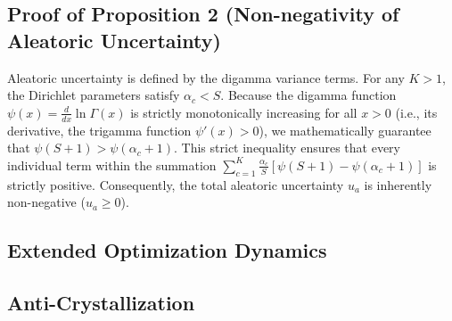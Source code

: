 \documentclass[letterpaper]{article} %
\begin{document}
\subsection{Proof of Proposition 2 (Non-negativity of Aleatoric Uncertainty)}
Aleatoric uncertainty is defined by the digamma variance terms. For any $K > 1$, the Dirichlet parameters satisfy $\alpha_c < S$. Because the digamma function $\psi(x) = \frac{d}{dx} \ln \Gamma(x)$ is strictly monotonically increasing for all $x > 0$ (i.e., its derivative, the trigamma function $\psi'(x) > 0$), we mathematically guarantee that $\psi(S + 1) > \psi(\alpha_c + 1)$. This strict inequality ensures that every individual term within the summation $\sum_{c=1}^K \frac{\alpha_c}{S} [\psi(S + 1) - \psi(\alpha_c + 1)]$ is strictly positive. Consequently, the total aleatoric uncertainty $u_a$ is inherently non-negative ($u_a \ge 0$).


\subsection{Extended Optimization Dynamics}
\subsection{Anti-Crystallization}\label{subsec:anti_crystal}
\end{document}
